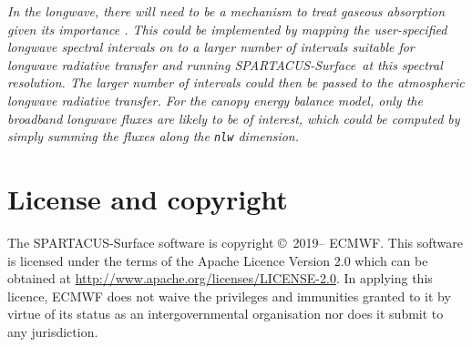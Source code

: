 \documentclass[a4,oneside]{article}
\def\codesize{\small}
\def\spsurf{\emph{SPARTACUS-Surface}}
\def\code#1{{\codesize\texttt{#1}}}
\begin{document}
\emph{In the longwave, there will need to be a mechanism to treat
  gaseous absorption given its importance \cite[]{Hogan2019b}. This
  could be implemented by mapping the user-specified longwave spectral
  intervals on to a larger number of intervals suitable for longwave
  radiative transfer and running \spsurf\ at this spectral resolution.
  The larger number of intervals could then be passed to the
  atmospheric longwave radiative transfer.  For the canopy energy
  balance model, only the broadband longwave fluxes are likely to be
  of interest, which could be computed by simply summing the fluxes along
  the \code{nlw} dimension.}

\section{License and copyright}
The SPARTACUS-Surface software is copyright \copyright\ 2019-- ECMWF. This
software is licensed under the terms of the Apache Licence Version 2.0
which can be obtained at
\url{http://www.apache.org/licenses/LICENSE-2.0}.  In applying this
licence, ECMWF does not waive the privileges and immunities granted to
it by virtue of its status as an intergovernmental organisation nor
does it submit to any jurisdiction.
\end{document}
